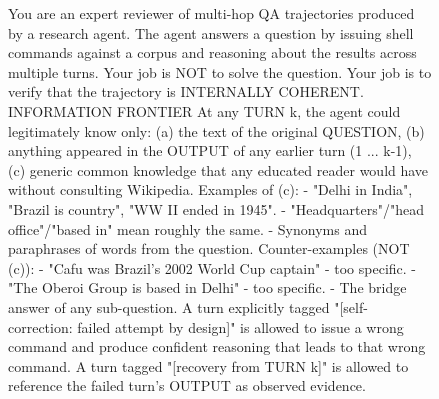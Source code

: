 \documentclass{article} %
\begin{document}
\begin{figure}[!t]
\begin{promptbox}
You are an expert reviewer of multi-hop QA trajectories produced by a research agent. The agent answers a question by issuing shell commands against a corpus and reasoning about the results across multiple turns. Your job is NOT to solve the question. Your job is to verify that the trajectory is INTERNALLY COHERENT.
INFORMATION FRONTIER
At any TURN k, the agent could legitimately know only:
  (a) the text of the original QUESTION,
  (b) anything appeared in the OUTPUT of any earlier turn (1 ... k-1),
  (c) generic common knowledge that any educated reader would have without consulting Wikipedia. Examples of (c):
    - "Delhi in India", "Brazil is country", "WW II ended in 1945".
    - "Headquarters"/"head office"/"based in" mean roughly the same.
    - Synonyms and paraphrases of words from the question.
      Counter-examples (NOT (c)):
    - "Cafu was Brazil's 2002 World Cup captain" - too specific.
    - "The Oberoi Group is based in Delhi" - too specific.
    - The bridge answer of any sub-question.
A turn explicitly tagged "[self-correction: failed attempt by design]" is allowed to issue a wrong command and produce confident reasoning that leads to that wrong command. A turn tagged "[recovery from TURN k]" is allowed to reference the failed turn's OUTPUT as observed evidence.


\end{promptbox}
\end{figure}
\end{document}
